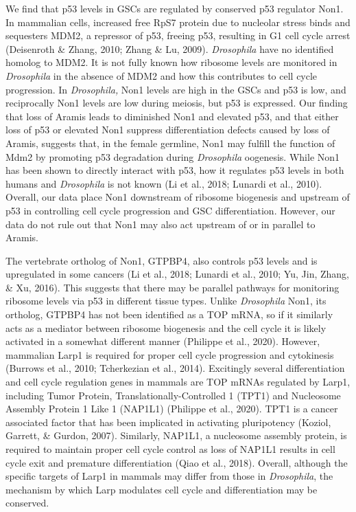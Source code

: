 \documentclass[12pt,twoside]{reedthesis}
\begin{document}
We find that p53 levels in GSCs are regulated by conserved p53 regulator
Non1. In mammalian cells, increased free RpS7 protein due to nucleolar
stress binds and sequesters MDM2, a repressor of p53, freeing p53,
resulting in G1 cell cycle arrest (Deisenroth \& Zhang, 2010; Zhang \& Lu, 2009). \emph{Drosophila} have no identified
homolog to MDM2. It is not fully known how ribosome levels are monitored
in \emph{Drosophila} in the absence of MDM2 and how this contributes to cell
cycle progression. In \emph{Drosophila,} Non1 levels are high in the GSCs and
p53 is low, and reciprocally Non1 levels are low during meiosis, but p53
is expressed. Our finding that loss of Aramis leads to diminished Non1
and elevated p53, and that either loss of p53 or elevated Non1 suppress
differentiation defects caused by loss of Aramis, suggests that, in the
female germline, Non1 may fulfill the function of Mdm2 by promoting p53
degradation during \emph{Drosophila} oogenesis. While Non1 has been shown to
directly interact with p53, how it regulates p53 levels in both humans
and \emph{Drosophila} is not known (Li et al., 2018; Lunardi et al., 2010). Overall,
our data place Non1 downstream of ribosome biogenesis and upstream of
p53 in controlling cell cycle progression and GSC differentiation.
However, our data do not rule out that Non1 may also act upstream of or
in parallel to Aramis.

The vertebrate ortholog of Non1, GTPBP4, also controls p53 levels and is
upregulated in some cancers (Li et al., 2018; Lunardi et al., 2010; Yu, Jin, Zhang, \& Xu, 2016). This suggests that there may be
parallel pathways for monitoring ribosome levels via p53 in different
tissue types. Unlike \emph{Drosophila} Non1, its ortholog, GTPBP4 has not
been identified as a TOP mRNA, so if it similarly acts as a mediator
between ribosome biogenesis and the cell cycle it is likely activated in
a somewhat different manner (Philippe et al., 2020).
However, mammalian Larp1 is required for proper cell cycle progression
and cytokinesis (Burrows et al., 2010; Tcherkezian et al., 2014).
Excitingly several differentiation and cell cycle regulation genes in
mammals are TOP mRNAs regulated by Larp1, including Tumor Protein,
Translationally-Controlled 1 (TPT1) and Nucleosome Assembly Protein 1
Like 1 (NAP1L1) (Philippe et al., 2020). TPT1 is a cancer
associated factor that has been implicated in activating pluripotency
(Koziol, Garrett, \& Gurdon, 2007). Similarly, NAP1L1, a
nucleosome assembly protein, is required to maintain proper cell cycle
control as loss of NAP1L1 results in cell cycle exit and premature
differentiation (Qiao et al., 2018). Overall, although
the specific targets of Larp1 in mammals may differ from those in
\emph{Drosophila}, the mechanism by which Larp modulates cell cycle and
differentiation may be conserved.
\end{document}
